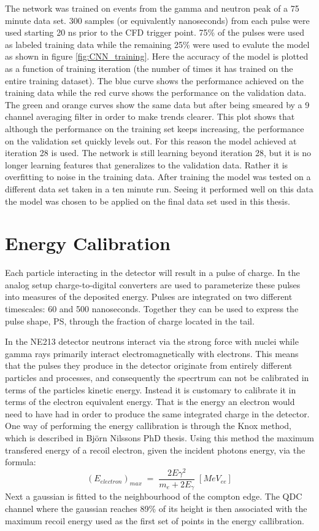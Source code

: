 \documentclass[main.tex]{subfiles}
\begin{document}
The network was trained on events from the gamma and neutron peak of a 75 minute data set. 300 samples (or equivalently nanoseconds) from each pulse were used starting 20 ns prior to the CFD trigger point. 75\% of the pulses were used as labeled training data while the remaining 25\% were used to evalute the model as shown in figure \ref{fig:CNN_training}. Here the accuracy of the model is plotted as a function of training iteration (the number of times it has trained on the entire training dataset). The blue curve shows the performance achieved on the training data while the red curve shows the performance on the validation data. The green and orange curves show the same data but after being smeared by a 9 channel averaging filter in order to make trends clearer. This plot shows that although the performance on the training set keeps increasing, the performance on the validation set quickly levels out. For this reason the model achieved at iteration 28 is used. The network is still learning beyond iteration 28, but it is no longer learning features that generalizes to the validation data. Rather it is overfitting to noise in the training data. After training the model was tested on a different data set taken in a ten minute run. Seeing it performed well on this data the model was chosen to be applied on the final data set used in this thesis.


\section{Energy Calibration}
Each particle interacting in the detector will result in a pulse of charge. In the analog setup charge-to-digital converters are used to parameterize these pulses into measures of the deposited energy. Pulses are integrated on two different timescales: 60 and 500 nanoseconds. Together they can be used to express the pulse shape, PS, through the fraction of charge located in the tail.

In the NE213 detector neutrons interact via the strong force with nuclei while gamma rays primarily interact electromagnetically with electrons. This means that the pulses they produce in the detector originate from entirely different particles and processes, and consequently the specrtrum can not be calibrated in terms of the particles kinetic energy. Instead it is customary to calibrate it in terms of the electron equivalent energy. That is the energy an electron would need to have had in order to produce the same integrated charge in the detector. One way of performing the energy callibration is through the Knox method, which is described in Björn Nilssons PhD thesis\cite[pg. 55]{Nilsson}. Using this method the maximum transfered energy of a recoil electron, given the incident photons energy, via the formula:
\begin{equation}
	(E_{electron})_{max}\;=\;\frac{2E\gamma^2}{m_e + 2E_\gamma} \;[MeV_{ee}]
\end{equation}
Next a gaussian is fitted to the neighbourhood of the compton edge. The QDC channel where the gaussian reaches 89\% of its height is then associated with the maximum recoil energy used as the first set of points in the energy callibration.
\end{document}
